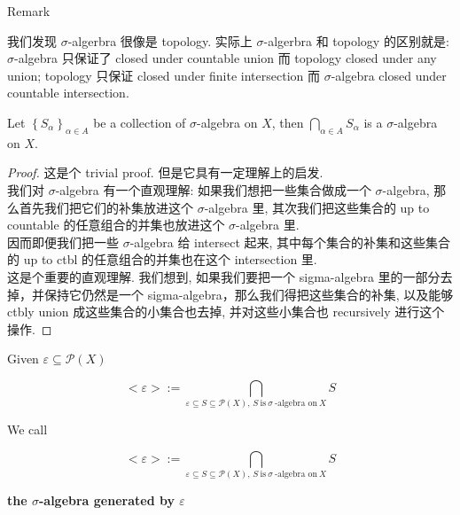 \begin{qlremark}{Remark}

我们发现 \(\sigma\)-algerbra 很像是 topology. 实际上 \(\sigma\)-algerbra 和 topology 的区别就是: \(\sigma\)-algebra 只保证了 closed under countable union 而 topology closed under any union; topology 只保证 closed under finite intersection 而 \(\sigma\)-algebra closed under countable intersection.

\end{qlremark}

\begin{lemma}{}

Let \(\left\{ S_{\alpha} \right\}_{\alpha \in A}\) be a collection of \(\sigma\)-algebra on \(X\), then \(\bigcap_{\alpha \in A}S_{\alpha}\) is a \(\sigma\)-algebra on \(X\).

\end{lemma}

\begin{proof}

这是个 trivial proof. 但是它具有一定理解上的启发.\\
我们对 \(\sigma\)-algebra 有一个直观理解: 如果我们想把一些集合做成一个 \(\sigma\)-algebra, 那么首先我们把它们的补集放进这个 \(\sigma\)-algebra 里, 其次我们把这些集合的 up to countable 的任意组合的并集也放进这个 \(\sigma\)-algebra 里.\\
因而即便我们把一些 \(\sigma\)-algebra 给 intersect 起来, 其中每个集合的补集和这些集合的 up to ctbl 的任意组合的并集也在这个 intersection 里.\\
这是个重要的直观理解. 我们想到, 如果我们要把一个 sigma-algebra 里的一部分去掉，并保持它仍然是一个 sigma-algebra，那么我们得把这些集合的补集, 以及能够 ctbly union 成这些集合的小集合也去掉, 并对这些小集合也 recursively 进行这个操作.

\end{proof}

\begin{corollary}{}

Given \(\varepsilon \subseteq \mathcal{P}(X)\)

\[< \varepsilon > := \bigcap\limits_{\varepsilon \subseteq S \subseteq \mathcal{P}(X),\, S\ \text{is}\ \sigma\ \text{-algebra on}\ X}S\]

\end{corollary}

\begin{definition}{}

We call

\[< \varepsilon > := \bigcap\limits_{\varepsilon \subseteq S \subseteq \mathcal{P}(X),\, S\ \text{is}\ \sigma\ \text{-algebra on}\ X}S\]

\textbf{the \(\sigma\)-algebra generated by \(\varepsilon\)}

\end{definition}

